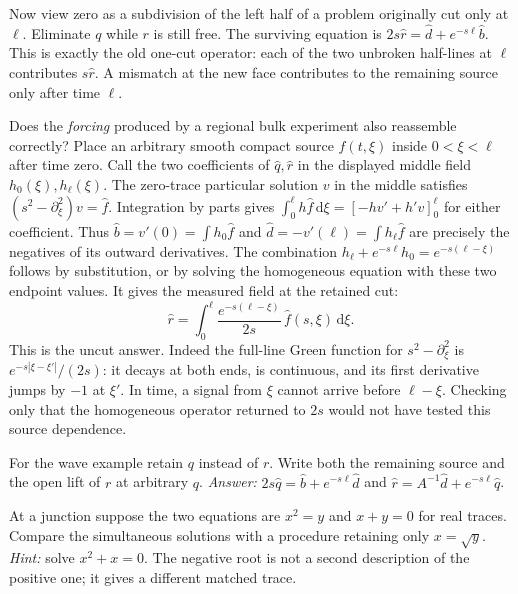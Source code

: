 Now view zero as a subdivision of the left half of a problem originally cut only at $\ell$. Eliminate $q$ while $r$ is still free. The surviving equation is $2s\widehat r=\widehat d+e^{-s\ell}\widehat b$. This is exactly the old one-cut operator: each of the two unbroken half-lines at $\ell$ contributes $s\widehat r$. A mismatch at the new face contributes to the remaining source only after time $\ell$.

Does the \emph{forcing} produced by a regional bulk experiment also reassemble correctly? Place an arbitrary smooth compact source $f(t,\xi)$ inside $0<\xi<\ell$ after time zero. Call the two coefficients of $\widehat q,\widehat r$ in the displayed middle field $h_0(\xi),h_\ell(\xi)$. The zero-trace particular solution $v$ in the middle satisfies $(s^2-\partial_\xi^2)v=\widehat f$. Integration by parts gives $\int_0^\ell h\widehat f\,\mathrm{d}\xi=[-h v'+h'v]_0^\ell$ for either coefficient. Thus $\widehat b=v'(0)=\int h_0\widehat f$ and $\widehat d=-v'(\ell)=\int h_\ell\widehat f$ are precisely the negatives of its outward derivatives. The combination $h_\ell+e^{-s\ell}h_0=e^{-s(\ell-\xi)}$ follows by substitution, or by solving the homogeneous equation with these two endpoint values. It gives the measured field at the retained cut:
\[
 \widehat r=\int_0^\ell \frac{e^{-s(\ell-\xi)}}{2s}\,\widehat f(s,\xi)\,\mathrm{d}\xi .
\]
This is the uncut answer. Indeed the full-line Green function for $s^2-\partial_\xi^2$ is $e^{-s|\xi-\xi'|}/(2s)$: it decays at both ends, is continuous, and its first derivative jumps by $-1$ at $\xi'$. In time, a signal from $\xi$ cannot arrive before $\ell-\xi$. Checking only that the homogeneous operator returned to $2s$ would not have tested this source dependence.

\begin{exercise}
For the wave example retain $q$ instead of $r$. Write both the remaining source and the open lift of $r$ at arbitrary $q$. \emph{Answer:} $2s\widehat q=\widehat b+e^{-s\ell}\widehat d$ and $\widehat r=A^{-1}\widehat d+e^{-s\ell}\widehat q$.
\end{exercise}

\begin{exercise}
At a junction suppose the two equations are $x^2=y$ and $x+y=0$ for real traces. Compare the simultaneous solutions with a procedure retaining only $x=\sqrt y$. \emph{Hint:} solve $x^2+x=0$. The negative root is not a second description of the positive one; it gives a different matched trace.
\end{exercise}
